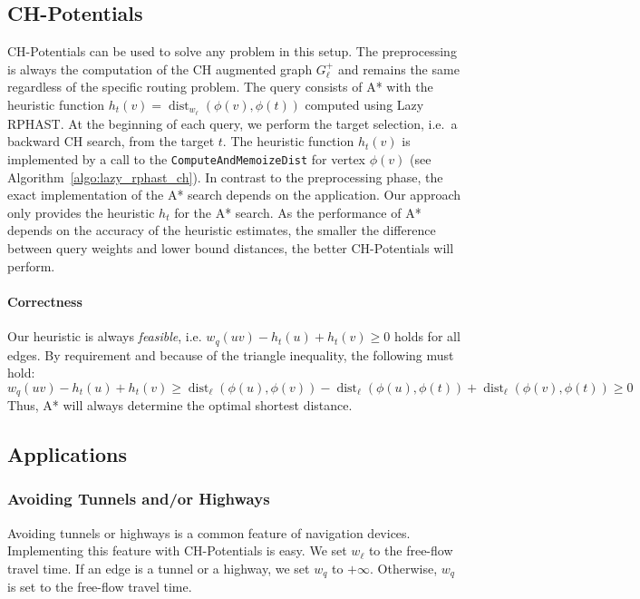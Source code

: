 \documentclass[manuscript,review]{acmart}
\newcommand*{\dist}{\operatorname{dist}}
\begin{document}
\subsection{CH-Potentials}\label{sec:chpot}
CH-Potentials can be used to solve any problem in this setup.
The preprocessing is always the computation of the CH augmented graph $G^+_{\ell}$ and remains the same regardless of the specific routing problem.
The query consists of A* with the heuristic function $h_t(v) = \dist_{w_{\ell}}(\phi(v), \phi(t))$ computed using Lazy RPHAST.
At the beginning of each query, we perform the target selection, i.e.\ a backward CH search, from the target $t$.
The heuristic function $h_t(v)$ is implemented by a call to the \texttt{ComputeAndMemoizeDist} for vertex $\phi(v)$ (see Algorithm~\ref{algo:lazy_rphast_ch}).
In contrast to the preprocessing phase, the exact implementation of the A* search depends on the application.
Our approach only provides the heuristic $h_t$ for the A* search.
As the performance of A* depends on the accuracy of the heuristic estimates, the smaller the difference between query weights and lower bound distances, the better CH-Potentials will perform.

\paragraph{Correctness}
Our heuristic is always \emph{feasible}, i.e. $w_q(u v) - h_t(u) + h_t(v) \geq 0$ holds for all edges.
By requirement and because of the triangle inequality, the following must hold:
\[
w_q(u v) - h_t(u) + h_t(v) \geq \dist_\ell(\phi(u), \phi(v)) - \dist_\ell(\phi(u), \phi(t)) + \dist_\ell(\phi(v), \phi(t)) \geq 0
\]
Thus, A* will always determine the optimal shortest distance.

\subsection{Applications}\label{sec:applications}
\subsubsection{Avoiding Tunnels and/or Highways}
\label{sec:no-tunnel-highway}

Avoiding tunnels or highways is a common feature of navigation devices.
Implementing this feature with CH-Potentials is easy.
We set $w_\ell$ to the free-flow travel time.
If an edge is a tunnel or a highway, we set $w_q$ to $+\infty$.
Otherwise, $w_q$ is set to the free-flow travel time.
\end{document}
